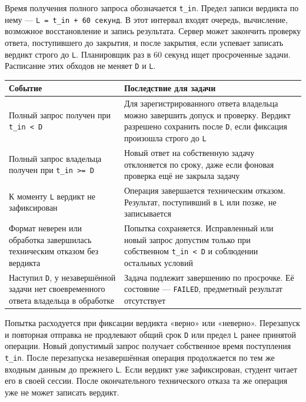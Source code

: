 \documentclass[12pt,a4paper]{article}
\begin{document}
Время получения полного запроса обозначается \texttt{t\_in}. Предел записи вердикта по нему --- \texttt{L =\allowbreak{} t\_\allowbreak{}in + 60 секунд}. В этот интервал входят очередь, вычисление, возможное восстановление и запись результата. Сервер может закончить проверку ответа, поступившего до закрытия, и после закрытия, если успевает записать вердикт строго до \texttt{L}. Планировщик раз в 60 секунд ищет просроченные задачи. Расписание этих обходов не меняет \texttt{D} и \texttt{L}.

{\def\LTcaptype{none} %
\begin{longtable}[]{@{}
  >{\raggedright\arraybackslash}p{}
  >{\raggedright\arraybackslash}p{}@{}}
\toprule\noalign{}
\begin{minipage}[b]{\linewidth}\raggedright
Событие
\end{minipage} & \begin{minipage}[b]{\linewidth}\raggedright
Последствие для задачи
\end{minipage} \\
\midrule\noalign{}
\endhead
\bottomrule\noalign{}
\endlastfoot
Полный запрос получен при \texttt{t\_in\ \textless{}\ D} & Для зарегистрированного ответа владельца можно завершить допуск и проверку. Вердикт разрешено сохранить после \texttt{D}, если фиксация произошла строго до \texttt{L} \\
Полный запрос владельца получен при \texttt{t\_in\ \textgreater{}=\ D} & Новый ответ на собственную задачу отклоняется по сроку, даже если фоновая проверка ещё не закрыла задачу \\
К моменту \texttt{L} вердикт не зафиксирован & Операция завершается техническим отказом. Результат, поступивший в \texttt{L} или позже, не записывается \\
Формат неверен или обработка завершилась техническим отказом без вердикта & Попытка сохраняется. Исправленный или новый запрос допустим только при собственном \texttt{t\_in\ \textless{}\ D} и соблюдении остальных условий \\
Наступил \texttt{D}, у незавершённой задачи нет своевременного ответа владельца в обработке & Задача подлежит завершению по просрочке. Её состояние --- \texttt{FAILED}, предметный результат отсутствует \\
\end{longtable}
}

Попытка расходуется при фиксации вердикта «верно» или «неверно». Перезапуск и повторная отправка не продлевают общий срок \texttt{D} или предел \texttt{L} ранее принятой операции. Новый допустимый запрос получает собственное время поступления \texttt{t\_in}. После перезапуска незавершённая операция продолжается по тем же входным данным до прежнего \texttt{L}. Если вердикт уже зафиксирован, студент читает его в своей сессии. После окончательного технического отказа та же операция уже не может записать вердикт.
\end{document}
